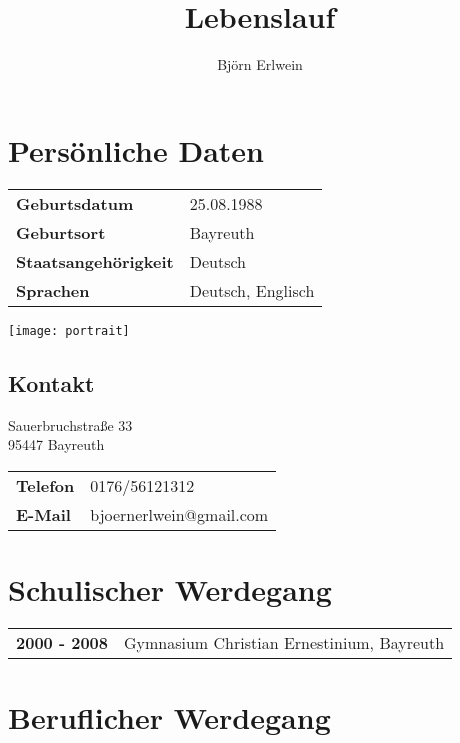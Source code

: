 \documentclass[10pt,ngerman,a4paper]{article}
\title{Lebenslauf}
\author{Björn Erlwein}
\date{\vspace{-5ex}} %
\begin{document}

\maketitle

\section{Persönliche Daten}
\begin{minipage}{0.3\textwidth}
\begin{tabular}{ll}
\textbf{Geburtsdatum} & 25.08.1988\\
\textbf{Geburtsort} & Bayreuth\\
\textbf{Staatsangehörigkeit} & Deutsch\\
\textbf{Sprachen} & Deutsch, Englisch
\end{tabular}
\end{minipage}
\begin{minipage}{0.6\textwidth}
\flushright
\texttt{[image: portrait]}
\end{minipage}
\subsection{Kontakt}

Sauerbruchstraße 33\\
95447 Bayreuth

\begin{tabular}{ll}
\textbf{Telefon} & 0176/56121312\\
\textbf{E-Mail} & bjoernerlwein@gmail.com
\end{tabular}

\section{Schulischer Werdegang}

\begin{tabular}{ll}
\textbf{2000 - 2008} & Gymnasium Christian Ernestinium, Bayreuth
\end{tabular}

\section{Beruflicher Werdegang}
\end{document}
